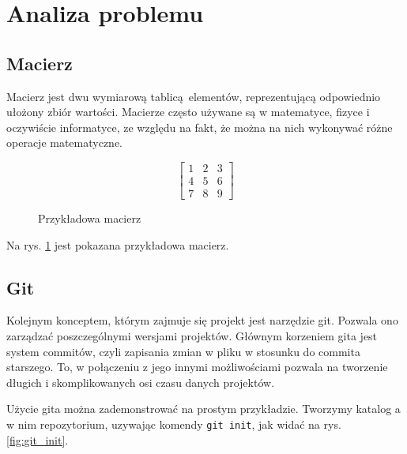 \newpage
\section{Analiza problemu}		%

\subsection{Macierz}

Macierz\cite{matrixwiki} jest dwu wymiarową tablicą elementów, reprezentującą odpowiednio ułożony zbiór wartości. Macierze często używane są w matematyce, fizyce i oczywiście informatyce, ze względu na fakt, że można na nich wykonywać różne operacje matematyczne. 

\begin{figure}[H]
	\begin{center}
		\[
		\begin{bmatrix}
		1 & 2 & 3 \\
		4 & 5 & 6 \\
		7 & 8 & 9
		\end{bmatrix}
		\]
	\end{center}
	\caption{Przykładowa macierz}
	\label{fig:matrix_example}
\end{figure}

Na rys. \ref{fig:matrix_example} jest pokazana przykładowa macierz.

\subsection{Git}
Kolejnym konceptem, którym zajmuje się projekt jest narzędzie git\cite{gitsite}. Pozwala ono zarządzać poszczególnymi wersjami projektów. Głównym korzeniem gita jest system commitów, czyli zapisania zmian w pliku w stosunku do commita starszego. To, w połączeniu z jego innymi możliwościami pozwala na tworzenie długich i skomplikowanych osi czasu danych projektów. 

Użycie gita można zademonstrować na prostym przykładzie. Tworzymy katalog a w nim repozytorium, uzywając komendy \texttt{git init}, jak widać na rys. \ref{fig:git_init}.

